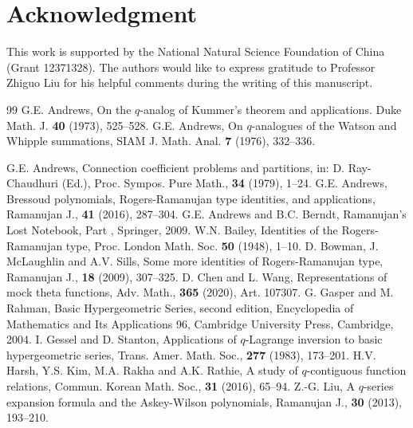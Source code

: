 \documentclass[reqno,12pt]{amsart}
\theoremstyle{remark}
\numberwithin{equation}{section}
\begin{document}
\section{Acknowledgment}
This work is supported by the National Natural Science Foundation of China (Grant 12371328).
The authors  would like to  express gratitude to Professor Zhiguo Liu for his helpful comments during the writing of this manuscript.
\begin{thebibliography}{99}
G.E. Andrews, On the $q$-analog of Kummer's theorem and applications.
Duke Math. J. \textbf{40} (1973), 525--528.
G.E. Andrews, On $q$-analogues of the Watson and Whipple summations, SIAM J. Math. Anal. \textbf{7} (1976), 332--336.

G.E. Andrews, Connection coefficient problems and partitions, in: D. Ray-Chaudhuri (Ed.), Proc. Sympos. Pure Math., \textbf{34} (1979), 1--24.
    G.E. Andrews, Bressoud polynomials, Rogers-Ramanujan type identities, and applications, 
    Ramanujan J., \textbf{41} (2016), 287--304.
 G.E. Andrews and B.C. Berndt, Ramanujan's Lost Notebook, Part \uppercase\expandafter{}, Springer, 2009.
     W.N. Bailey, Identities of the Rogers-Ramanujan type, Proc. London Math. Soc. \textbf{50} (1948), 1--10.
     D. Bowman, J. McLaughlin and A.V. Sills, Some more identities of Rogers-Ramanujan type, Ramanujan J., \textbf{18} (2009), 307--325.
D. Chen and L. Wang, Representations of mock theta functions, Adv. Math., \textbf{365} (2020), Art. 107307.
G. Gasper and M. Rahman,
Basic Hypergeometric Series, second edition,
Encyclopedia of Mathematics and Its Applications 96, Cambridge
University Press, Cambridge, 2004.
I. Gessel and D. Stanton, Applications of $q$-Lagrange inversion to basic hypergeometric series, Trans. Amer. Math. Soc., \textbf{277} (1983), 173--201.
H.V. Harsh, Y.S. Kim, M.A. Rakha and A.K. Rathie, A study of $q$-contiguous function relations, Commun. Korean Math. Soc., \textbf{31} (2016), 65--94.
    Z.-G. Liu, A $q$-series expansion formula and the Askey-Wilson polynomials, Ramanujan J., \textbf{30} (2013), 193--210.

\end{thebibliography}
\end{document}
